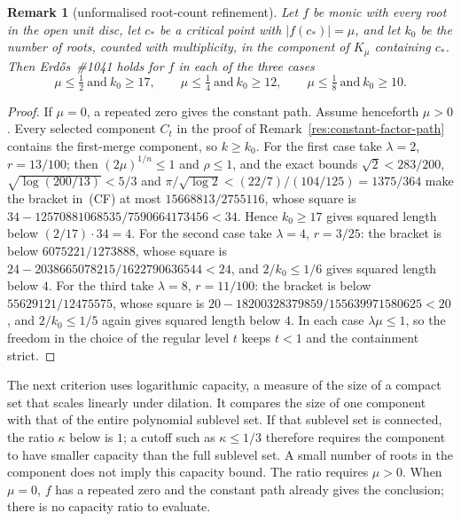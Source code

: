 \documentclass[11pt]{article}
\newtheorem{remark}[theorem]{Remark}
\begin{document}
\begin{remark}[unformalised root-count refinement]
\label{res:constant-factor-arity}
Let $f$ be monic with every root in the open unit disc, let $c_*$ be a
critical point with $|f(c_*)|=\mu$, and let $k_0$ be the number of roots,
counted with multiplicity, in the component of $K_\mu$ containing $c_*$.
Then Erd\H{o}s~\#1041 holds for $f$ in each of the three cases
\[
 \mu\le\tfrac12\ \text{and}\ k_0\ge17,\qquad
 \mu\le\tfrac14\ \text{and}\ k_0\ge12,\qquad
 \mu\le\tfrac18\ \text{and}\ k_0\ge10 .
\]
\end{remark}


\begin{proof}
If $\mu=0$, a repeated zero gives the constant path. Assume henceforth
$\mu>0$. Every selected component $C_t$ in the proof of
Remark~\ref{res:constant-factor-path} contains the first-merge component, so
$k\ge k_0$.  For the first case take $\lambda=2$, $r=13/100$; then
$(2\mu)^{1/n}\le1$ and $\rho\le1$, and the exact bounds
$\sqrt2<283/200$, $\sqrt{\log(200/13)}<5/3$ and
$\pi/\sqrt{\log2}<(22/7)/(104/125)=1375/364$ make the bracket in~(CF) at most
$15668813/2755116$, whose square is $34-12570881068535/7590664173456<34$.
Hence $k_0\ge17$ gives squared length below $(2/17)\cdot34=4$.  For the second
case take $\lambda=4$, $r=3/25$: the bracket is below $6075221/1273888$, whose
square is $24-2038665078215/1622790636544<24$, and $2/k_0\le1/6$ gives squared
length below $4$.  For the third take $\lambda=8$, $r=11/100$: the bracket is
below $55629121/12475575$, whose square is
$20-18200328379859/155639971580625<20$, and $2/k_0\le1/5$ again gives squared
length below $4$.  In each case $\lambda\mu\le1$, so the freedom in
the choice of the regular level $t$ keeps $t<1$ and the containment strict.
\end{proof}

The next criterion uses logarithmic capacity, a measure of the size of a
compact set that scales linearly under dilation. It compares the size of
one component with that of the entire polynomial sublevel set. If that
sublevel set is connected, the ratio $\kappa$ below is $1$; a cutoff such
as $\kappa\le1/3$ therefore requires the component to have smaller
capacity than the full sublevel set. A small number of roots in the
component does not imply this capacity bound. The ratio requires $\mu>0$. When $\mu=0$,
$f$ has a repeated zero and the constant path already gives the conclusion;
there is no capacity ratio to evaluate.
\end{document}

